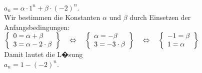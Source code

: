 \documentclass{article}
\begin{document}
\begin{enumerate}
      \\[0.2cm]
      \hspace*{1.3cm} $a_n = \alpha \cdot  1^n + \beta \cdot  (-2)^n$. \\[0.2cm]
      Wir bestimmen die Konstanten $\alpha$ und $\beta$ durch Einsetzen
      der Anfangsbedingungen: 
      \\[0.2cm]
      \hspace*{1.3cm}
       $
      \left\{\begin{array}[c]{lcl}
        0 = \alpha + \beta \\
        3 = \alpha - 2\cdot \beta \\
      \end{array}\right\} \quad \Leftrightarrow\quad
      \left\{\begin{array}[c]{lcl}
        \alpha = -\beta \\
        3 = -3\cdot \beta  \\
      \end{array}\right\} \quad \Leftrightarrow\quad
      \left\{\begin{array}[c]{lcl}
        -1 = \beta  \\
        1 = \alpha \\
      \end{array}\right\} 
      $
      \\[0.2cm]
      Damit lautet die L�sung 
      \\[0.2cm]
      \hspace*{1.3cm} $a_n = 1 - (-2)^n$.
\end{enumerate}
\end{document}
